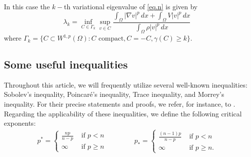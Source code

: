 \documentclass[12pt]{amsart}
\theoremstyle{definition}
\theoremstyle{remark}
\numberwithin{equation}{section}
\begin{document}
In this case the $k-$th variational eigenvalue of \eqref{eq.n} is given by
$$
\lambda_k=\inf_{C\in \Gamma_k} \sup_{v\in C} \frac{\int_\Omega |\nabla v|^p\,dx + \int_\Omega V |v|^p\,dx}{\int_\Omega \rho|v|^p\,dx}
$$
where $\Gamma_k=\{C\subset W^{1,p}(\Omega)\colon C \text{ compact}, C=-C, \gamma(C)\geq k\}$.

  


 

\subsection{Some useful inequalities}
Throughout this article, we will frequently utilize several well-known inequalities: Sobolev's inequality, Poincaré's inequality, Trace inequality, and Morrey's inequality. For their precise statements and proofs, we refer, for instance, to \cite{Leoni}. Regarding the applicability of these inequalities, we define the following critical exponents:
\begin{align*}
p^*=
\begin{cases}
\frac{np}{n-p} &\text{ if } p<n\\
\infty &\text{ if } p\geq n
\end{cases}
\qquad \qquad 
p_*=
\begin{cases}
\frac{(n-1)p}{n-p} &\text{ if } p<n\\
\infty &\text{ if } p\geq n.
\end{cases}
\end{align*}
\end{document}
